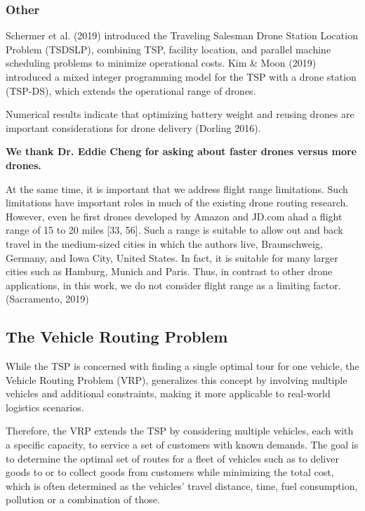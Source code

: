 \documentclass{article}
\begin{document}
	\subsubsection{Other}
	Schermer et al. (2019) introduced the Traveling Salesman Drone Station Location Problem (TSDSLP), combining TSP, facility location, and parallel machine scheduling problems to minimize operational costs. 
	Kim \& Moon (2019) introduced a mixed integer programming model for the TSP with a drone station (TSP-DS), which extends the operational range of drones. 
	\par 
	\par 
	Numerical results indicate that optimizing battery weight and reusing drones are important considerations for drone delivery (Dorling 2016).
	\par 
	\textbf{We thank Dr. Eddie Cheng for asking about faster drones versus more drones.}
	\par
	At the same time, it is important that we address flight range limitations. Such limitations have important roles in much of the existing drone routing research. However, even he first drones developed by Amazon and JD.com ahad a flight range of 15 to 20 miles [33, 56]. Such a range is suitable to allow out and back travel in the medium-sized cities in which the authors live, Braunschweig, Germany, and Iowa City, United States. In fact, it is suitable for many larger cities such as Hamburg, Munich and Paris. Thus, in contrast to other drone applications, in this work, we do not consider flight range as a limiting factor. (Sacramento, 2019)
	
	
	
	\subsection{The Vehicle Routing Problem}
	While the TSP is concerned with finding a single optimal tour for one vehicle, the Vehicle Routing Problem (VRP), generalizes this concept by involving multiple vehicles and additional constraints, making it more applicable to real-world logistics scenarios.
	\par
	Therefore, the VRP extends the TSP by considering multiple vehicles, each with a specific capacity, to service a set of customers with known demands. The goal is to determine the optimal set of routes for a fleet of vehicles such as to deliver goods to or to collect goods from customers while minimizing the total cost, which is often determined as the vehicles' travel distance, time, fuel consumption, pollution or a combination of those. 
\end{document}
